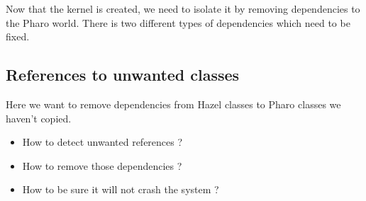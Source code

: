 %
%
%
%


Now that the kernel is created, we need to isolate it by removing dependencies 
to the \gls{Pharo} world. There is two different types of dependencies which need to be fixed.

\subsection{References to unwanted classes}

\goal Here we want to remove dependencies from Hazel classes to \gls{Pharo} classes we haven't copied.

\problems
\begin{itemize}
	\item How to detect unwanted references ?
	\item How to remove those dependencies ?
	\item How to be sure it will not crash the system ?
\end{itemize}

